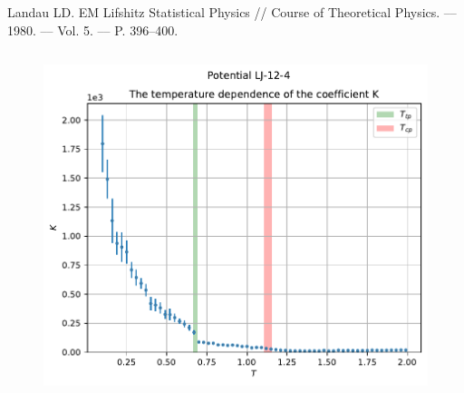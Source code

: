 \documentclass[pdf,hyperref={unicode}]{beamer}
\begin{document}
\begin{frame}
\begin{columns}
\end{columns}
\vspace{2mm}
\tiny{
Landau LD. EM Lifshitz Statistical Physics // Course of Theoretical
Physics. –– 1980. –– Vol. 5. –– P. 396–400.
}

\end{frame}





\begin{frame}
\transdissolve[duration=0.2]

\begin{columns}

\begin{column}{0.6\linewidth}
{
\begin{figure}[h]
\begin{center}
\begin{minipage}[h]{0.45\linewidth}
\includegraphics[width=\textwidth, keepaspectratio]{plot_K_Potential LJ-12-4_1}
\end{minipage}
\begin{minipage}[h]{0.45\linewidth}

\end{minipage}
\end{center}
\end{figure}}
\end{column}
\end{columns}
\end{frame}
\end{document}
